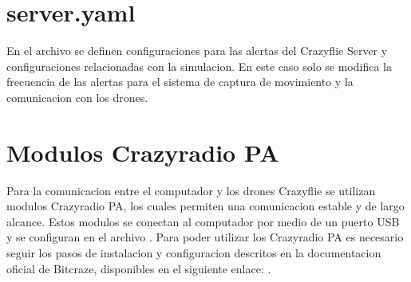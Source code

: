 \documentclass[a4paper,11pt,spanish]{sphinxmanual}
\begin{document}
\section{server.yaml}
\label{\detokenize{configuracion:server-yaml}}
\sphinxAtStartPar
En el archivo  se definen configuraciones para las alertas del Crazyflie Server y configuraciones relacionadas con la simulacion. En este caso solo se modifica la frecuencia de las alertas para el sistema de captura de movimiento y la comunicacion con los drones.

\begin{sphinxVerbatim}[commandchars=\\\{\}]
\PYG{p+pIndicator}{[}\PYG{p+pIndicator}{]}
\end{sphinxVerbatim}


\section{Modulos Crazyradio PA}
\label{\detokenize{configuracion:modulos-crazyradio-pa}}
\sphinxAtStartPar
Para la comunicacion entre el computador y los drones Crazyflie se utilizan modulos Crazyradio PA, los cuales permiten una comunicacion estable y de largo alcance. Estos modulos se conectan al computador por medio de un puerto USB y se configuran en el archivo . Para poder utilizar los Crazyradio PA es necesario seguir los pasos de instalacion y configuracion descritos en la documentacion oficial de Bitcraze, disponibles en el siguiente enlace: .
\end{document}
